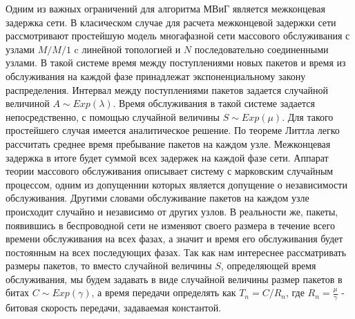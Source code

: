 Одним из важных ограничений для алгоритма МВиГ является межконцевая задержка сети. В класическом случае для расчета межконцевой задержки сети рассмотривают простейшую модель многафазной сети массового обслуживания  с узлами $M/M/1$ c линейной топологией и $N$ последовательно соединенными узлами. В такой системе время между поступлениями новых пакетов и время из обслуживания на каждой фазе принадлежат экспоненциальному закону распределения. Интервал между поступлениями пакетов задается случайной величиной $A \sim Exp(\lambda)$. Время обслуживания в такой системе задается непосредственно, с помощью случайной величины $S \sim Exp(\mu)$. Для такого простейшего случая имеется аналитическое решение. По теореме Литтла легко рассчитать среднее время пребывание пакетов на каждом узле. Межконцевая задержка в итоге будет суммой всех задержек на каждой фазе сети. Аппарат теории массового обслуживания описывает систему с марковским случайным процессом, одним из допущеннии которых является допущение о независимости обслуживания. Другими словами обслуживание пакетов на каждом узле происходит случайно и независимо от других узлов.  
В реальности же, пакеты, появившись в беспроводной сети не изменяют своего размера в течение всего времени обслуживания на всех фазах, а значит и время его обслуживания будет постоянным на всех последующих фазах. Так как нам интереснее рассматривать размеры пакетов, то вместо случайной величины $S$, определяющей время обслуживания, мы будем задавать в виде случайной величины размер пакетов в битах $C \sim Exp(\gamma)$, а время передачи определять как $T_n = C/R_n$, где $R_n = \frac{\mu}{\gamma}$ - битовая скорость передачи, задаваемая константой.

